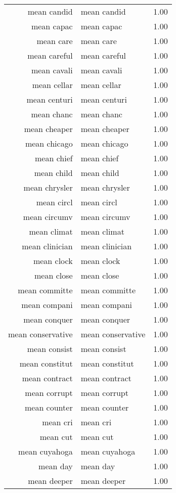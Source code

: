 \begin{table}[ht]
\begin{tabular}{rlr}
  mean candid & mean candid & 1.00 \\ 
  mean capac & mean capac & 1.00 \\ 
  mean care & mean care & 1.00 \\ 
  mean careful & mean careful & 1.00 \\ 
  mean cavali & mean cavali & 1.00 \\ 
  mean cellar & mean cellar & 1.00 \\ 
  mean centuri & mean centuri & 1.00 \\ 
  mean chanc & mean chanc & 1.00 \\ 
  mean cheaper & mean cheaper & 1.00 \\ 
  mean chicago & mean chicago & 1.00 \\ 
  mean chief & mean chief & 1.00 \\ 
  mean child & mean child & 1.00 \\ 
  mean chrysler & mean chrysler & 1.00 \\ 
  mean circl & mean circl & 1.00 \\ 
  mean circumv & mean circumv & 1.00 \\ 
  mean climat & mean climat & 1.00 \\ 
  mean clinician & mean clinician & 1.00 \\ 
  mean clock & mean clock & 1.00 \\ 
  mean close & mean close & 1.00 \\ 
  mean committe & mean committe & 1.00 \\ 
  mean compani & mean compani & 1.00 \\ 
  mean conquer & mean conquer & 1.00 \\ 
  mean conservative & mean conservative & 1.00 \\ 
  mean consist & mean consist & 1.00 \\ 
  mean constitut & mean constitut & 1.00 \\ 
  mean contract & mean contract & 1.00 \\ 
  mean corrupt & mean corrupt & 1.00 \\ 
  mean counter & mean counter & 1.00 \\ 
  mean cri & mean cri & 1.00 \\ 
  mean cut & mean cut & 1.00 \\ 
  mean cuyahoga & mean cuyahoga & 1.00 \\ 
  mean day & mean day & 1.00 \\ 
  mean deeper & mean deeper & 1.00 \\ 

\end{tabular}
\end{table}
